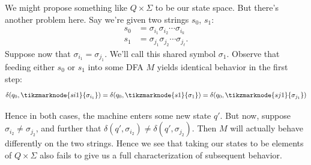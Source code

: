\documentclass{fkpaper}
\begin{document}
\begin{multicols}{2}
We might propose something like $Q \times \Sigma$ to be our state
space. But there's another problem here. Say we're given two strings
$s_0$, $s_1$:
\begin{align*}
  s_0
  &= \sigma_{i_1} \sigma_{i_2} \cdots \sigma_{i_k} \\
  s_1
  &= \sigma_{j_1} \sigma_{j_2} \cdots \sigma_{j_\ell}.
\end{align*}
Suppose now that $\sigma_{i_1} = \sigma_{j_1}$. We'll call this shared
symbol $\sigma_1$. Observe that feeding either $s_0$ or $s_1$ into
some DFA $M$ yields identical behavior in the first step:
\[
  \delta(q_0, \tikzmarknode{si1}{\sigma_{i_1}})
  = \delta(q_0, \tikzmarknode{s1}{\sigma_1})
  = \delta(q_0, \tikzmarknode{sj1}{\sigma_{j_1}})
\]

Hence in both cases, the machine enters some new state $q'$. But now,
suppose $\sigma_{i_2} \neq \sigma_{j_2}$, and further that $\delta(q',
\sigma_{i_2}) \neq \delta(q', \sigma_{j_2})$. Then $M$ will actually
behave differently on the two strings. Hence we see that taking our
states to be elements of $Q \times \Sigma$ also fails to give us a
full characterization of subsequent behavior.


\end{multicols}
\end{document}
